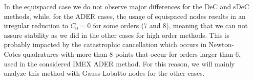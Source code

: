 In the equispaced case we do not observe major differences for the DeC and sDeC methods, 
while, for the ADER cases, the usage of equispaced nodes results in an irregular reduction to $C_0=0$ for some orders (7 and 8), meaning that we can not assure stability as we did in the other cases for high order methods. 
This is probably impacted by the catastrophic cancellation which occurs in Newton-Cotes quadratures with more than 8 points that occur for orders larger than $6$, used in the considered IMEX ADER method. 
For this reason, we will mainly analyze this method with Gauss-Lobatto nodes for the other cases.


